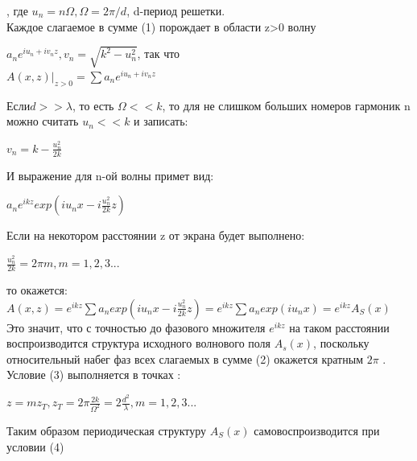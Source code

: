 \documentclass[a4paper,12pt]{article} %
\begin{document}
        , где $u_n=n\Omega, \Omega=2\pi/d $,
        d-период решетки. \\ Каждое слагаемое в сумме (1) порождает в области z>0 волну \\
        \begin{center}
        $a_n e^{iu_n + iv_n z},  v_n=\sqrt{k^2-u_n^2}$, так что \\
        $A(x,z)|_{z>0}=\sum a_n e^{iu_n + iv_n z} $   \\
        \end{center}
        Если$ d>>\lambda$, то есть $\Omega<<k$, то для не слишком больших номеров гармоник n можно считать $u_n << k$ и записать: \\
       \begin{center}
        $v_n=k- \frac{u^2 _n}{2k}$ \\
        \end{center}
        И выражение для n-ой волны примет вид: \\
        \begin{center}
        $a_n e^{ikz} exp(iu_n x - i \frac{u^2 _n}{2k} z )$ \\
\end{center}       
        Если на некотором расстоянии z от экрана будет выполнено: \\
        \begin{center}
       $ \frac{u^2 _n}{2k} = 2\pi m,   m=1,2,3...$   \\
       \end{center}
       то окажется: \\
       $ A(x,z) = e^{ikz} \sum a_n exp(iu_n x - i               \frac{u^2 _n}{2k }  z)=e^{ikz} \sum a_n exp(iu_n x )= e^{ikz} A_S (x) $ \\
       Это значит, что с точностью до фазового множителя $e^{ikz}$ на таком расстоянии воспроизводится структура исходного волнового поля $A_s(x)$, поскольку относительный набег фаз всех слагаемых в сумме (2) окажется кратным $2\pi$ . 
        \\
        Условие (3) выполняется в точках : \\
        \begin{center}
        $z=mz_T, z_T=2\pi \frac{2k}{\Omega ^2}=2\frac{d^2}{\lambda}, m=1,2,3...$  \\
        \end{center}	
        Таким образом периодическая структуру $A_S (x) $ самовоспроизводится при условии (4) \\
\end{document}
